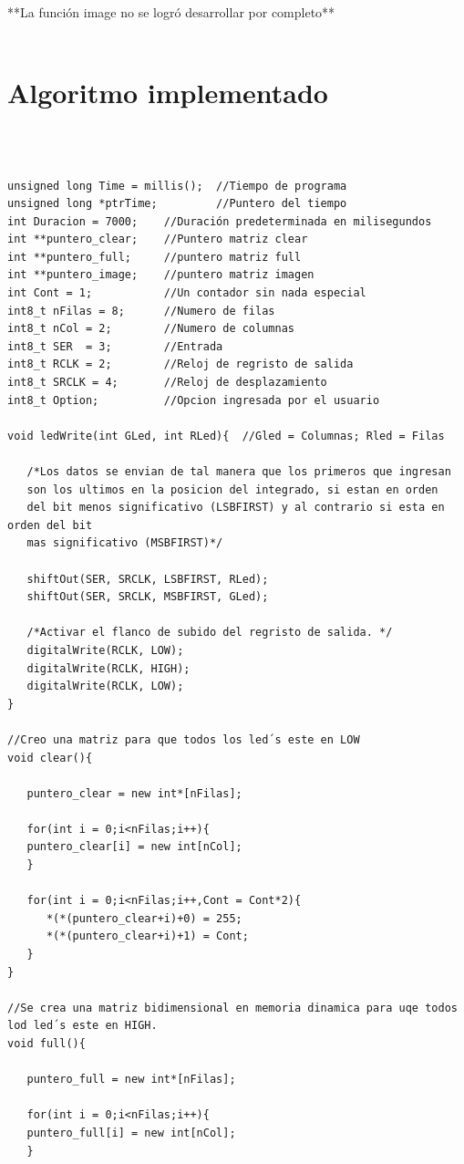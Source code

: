 \documentclass{article}
\begin{document}
**La función image no se logró desarrollar por completo**\\\\

\newpage
\section{\large Algoritmo implementado}\\\\
\begin{lstlisting}
unsigned long Time = millis(); 	//Tiempo de programa
unsigned long *ptrTime;			//Puntero del tiempo
int Duracion = 7000;    //Duración predeterminada en milisegundos
int **puntero_clear;	//Puntero matriz clear
int **puntero_full;		//puntero matriz full
int **puntero_image;	//puntero matriz imagen
int Cont = 1;			//Un contador sin nada especial
int8_t nFilas = 8;		//Numero de filas
int8_t nCol = 2;		//Numero de columnas
int8_t SER  = 3;		//Entrada
int8_t RCLK = 2;		//Reloj de regristo de salida
int8_t SRCLK = 4;		//Reloj de desplazamiento
int8_t Option;			//Opcion ingresada por el usuario

void ledWrite(int GLed, int RLed){	//Gled = Columnas; Rled = Filas
  
   /*Los datos se envian de tal manera que los primeros que ingresan 
   son los ultimos en la posicion del integrado, si estan en orden
   del bit menos significativo (LSBFIRST) y al contrario si esta en orden del bit
   mas significativo (MSBFIRST)*/ 
   
   shiftOut(SER, SRCLK, LSBFIRST, RLed);
   shiftOut(SER, SRCLK, MSBFIRST, GLed);
  
   /*Activar el flanco de subido del regristo de salida. */
   digitalWrite(RCLK, LOW);
   digitalWrite(RCLK, HIGH);
   digitalWrite(RCLK, LOW);
}

//Creo una matriz para que todos los led´s este en LOW
void clear(){
  
   puntero_clear = new int*[nFilas];
  
   for(int i = 0;i<nFilas;i++){
   puntero_clear[i] = new int[nCol];
   }
  
   for(int i = 0;i<nFilas;i++,Cont = Cont*2){
      *(*(puntero_clear+i)+0) = 255;
      *(*(puntero_clear+i)+1) = Cont;
   }
}

//Se crea una matriz bidimensional en memoria dinamica para uqe todos lod led´s este en HIGH.
void full(){
  
   puntero_full = new int*[nFilas];
  
   for(int i = 0;i<nFilas;i++){
   puntero_full[i] = new int[nCol];
   }
  

\end{lstlisting}
\end{document}
